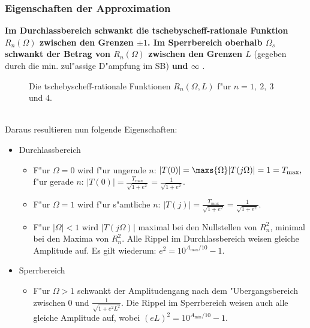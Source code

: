 \subsubsection{Eigenschaften der Approximation}
{\bf{\boldmath Im Durchlassbereich schwankt die tschebyscheff-rationale Funktion
  $R_{n} (\Omega)$ zwischen den Grenzen $\pm 1$. Im Sperrbereich
  oberhalb $\Omega_{s}$ schwankt der Betrag von $R_{n} (\Omega)$
  zwischen den Grenzen $L$}} (gegeben durch die min. zul"assige
D"ampfung im SB) {\bf{\boldmath und $\infty$}} \cite{MOS:89}.
\begin{figure}[!htb]
\vspace*{-3mm}%
\begin{center}%
  \caption{Die tschebyscheff-rationale Funktionen $R_{n} (\Omega,L)$  f"ur $n=1,~2,~3$ und $4$.}
\end{center}
\vspace*{-6mm} 
\end{figure}~\\
\nit Daraus resultieren nun folgende Eigenschaften:
\begin{itemize}
\item Durchlassbereich
\begin{itemize}
\item F"ur $\Omega=0$ wird f"ur ungerade $n$: $|T(0)|=\maxs{\Omega}|T(j\Omega)|=1=T_{\max},$\\
      \hspace*{3.4cm}f"ur gerade $n$: $|T(0)|=\frac{T_{\max}}{\sqrt{1+e^{2}}}=\frac{1}{\sqrt{1+e^{2}}}$.
\item F"ur $\Omega=1$ wird f"ur s"amtliche $n$: $|T(j)|=\frac{T_{\max}}{\sqrt{1+e^{2}}}=\frac{1}{\sqrt{1+e^{2}}}$.
\item F"ur $|\Omega| < 1$ wird $|T(j\Omega)|$ maximal bei den Nullstellen von
      $R_{n}^{2}$, minimal bei den Maxima von $R_{n}^{2}$. Alle Rippel im
      Durchlassbereich weisen gleiche Amplitude auf. Es gilt wiederum: $e^2=10^{A_{\max}/10}-1$.
\end{itemize}
\item Sperrbereich
\begin{itemize}
\item F"ur $\Omega > 1$ schwankt der Amplitudengang nach dem "Ubergangsbereich
      zwischen $0$ und $\frac{1}{\sqrt{1+e^{2}L^{2}}}$. Die Rippel im
      Sperrbereich weisen auch alle gleiche Amplitude auf, wobei $(eL)^2=10^{A_{\min}/10}-1$.
\end{itemize}
\end{itemize}


